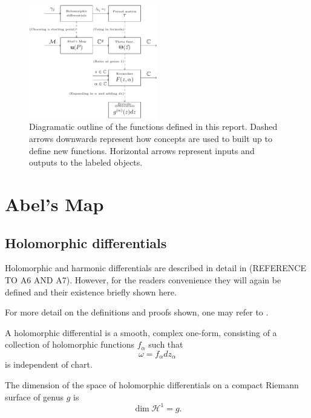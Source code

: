 \begin{figure}
    \center
    \includegraphics[width=0.5\textwidth]{assets/diagram.png}
    \caption{Diagramatic outline of the functions defined in this report. Dashed arrows downwards represent how concepts are used to built up to define new functions. Horizontal arrows represent inputs and outputs to the labeled objects.}
\end{figure}

\section{Abel's Map}\label{secB12:Abel}

\subsection{Holomorphic differentials}
Holomorphic and harmonic differentials are described in detail in (REFERENCE TO A6 AND A7). However, for the readers convenience they will again be defined and their existence briefly shown here.

For more detail on the definitions and proofs shown, one may refer to \cite{Ber06}.

\begin{definition}
    A holomorphic differential is a smooth, complex one-form, consisting of a collection of holomorphic functions $f_\alpha$ such that
    \begin{equation}
        \omega = f_\alpha dz_\alpha
    \end{equation}
    is independent of chart.
\end{definition}

\begin{theorem}
    The dimension of the space of holomorphic differentials on a compact Riemann surface of genus $g$ is
    \begin{equation}
        \dim \mathcal H^1 = g.
    \end{equation}
\end{theorem}

